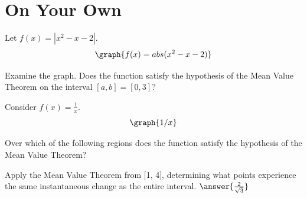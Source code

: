 \documentclass{ximera}
\begin{document}
\section{On Your Own}
Let $f(x)=\left|x^2-x-2\right|$.
\[
\graph{f(x)=abs(x^2-x-2)}
\]


\begin{question}
Examine the graph. Does the function satisfy the hypothesis of the Mean Value Theorem on the interval $[a,b]=[0,3]$?

\begin{multipleChoice}
\end{multipleChoice}

\end{question}

\begin{question}
Consider $f(x) = \frac{1}{x}$.
\[
\graph{1/x}
\]

Over which of the following regions does the function satisfy the hypothesis of the Mean Value Theorem?

\begin{selectAll}
\choice{$[-10,10]$}
\choice{$[0,10]$}
\choice[correct]{$[1,10]$}
\choice[correct]{$[-10,-1]$}
\choice{$[-10,0]$}
\end{selectAll}

Apply the Mean Value Theorem from [1, 4], determining what points experience the same instantaneous change as the entire interval.
$\answer{\frac{2}{\sqrt{3}}}$
\end{question}
\end{document}
